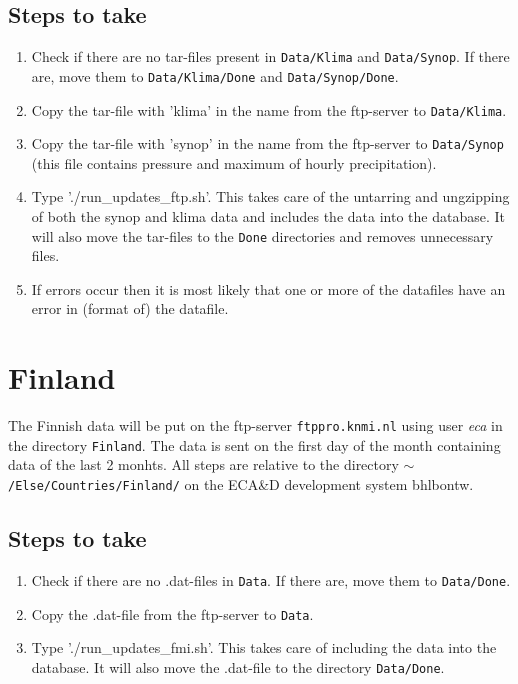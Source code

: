 \documentclass[a4paper]{article}
\begin{document}
\subsection*{Steps to take}

\begin{enumerate}
\item Check if there are no tar-files present in \texttt{Data/Klima}
  and \texttt{Data/Synop}. If there are, move them to
  \texttt{Data/Klima/Done} and \texttt{Data/Synop/Done}.
\item Copy the tar-file with 'klima' in the name from the ftp-server
  to \texttt{Data/Klima}.
\item Copy the tar-file with 'synop' in the name from the ftp-server
  to \texttt{Data/Synop} (this file contains pressure and maximum of
  hourly precipitation).
\item Type './run\_updates\_ftp.sh'. This takes care of the untarring
  and ungzipping of both the synop and klima data and includes the
  data into the database. It will also move the tar-files to the
  \texttt{Done} directories and removes unnecessary files.
\item If errors occur then it is most likely that one or more of the
  datafiles have an error in (format of) the datafile.
\end{enumerate}



\section{Finland}

The Finnish data will be put on the ftp-server \texttt{ftppro.knmi.nl}
using user \textit{eca} in the directory \texttt{Finland}. The data is
sent on the first day of the month containing data of the last 2
monhts. All steps are relative to the directory
\texttt{$\sim$/Else/Countries/Finland/} on the ECA\&D development
system bhlbontw.


\subsection*{Steps to take}

\begin{enumerate}
\item Check if there are no .dat-files in \texttt{Data}. If there are,
  move them to \texttt{Data/Done}.
\item Copy the .dat-file from the ftp-server to \texttt{Data}.
\item Type './run\_updates\_fmi.sh'. This takes care of including the
  data into the database. It will also move the .dat-file to the
  directory \texttt{Data/Done}.
\end{enumerate}
\end{document}
